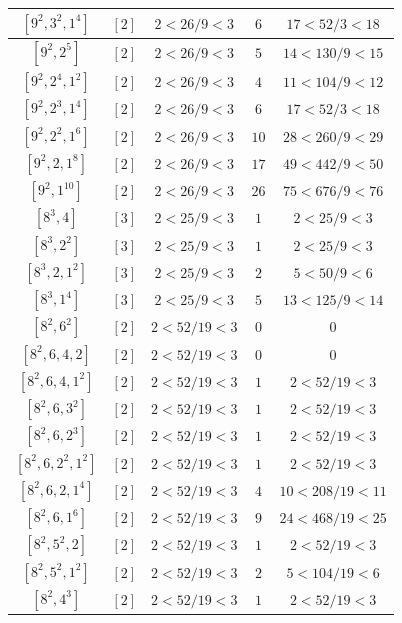 \documentclass{article}%
\begin{document}
\begin{center}
\begin{longtable}{||c|c|c|c|c||}
$[9^{2}, 3^{2}, 1^{4}]$ & $[2]$ & $2 < 26/9 < 3$ & $6$ & $17 < 52/3 < 18$ \\ \hline 
$[9^{2}, 2^{5}]$ & $[2]$ & $2 < 26/9 < 3$ & $5$ & $14 < 130/9 < 15$ \\ \hline 
$[9^{2}, 2^{4}, 1^{2}]$ & $[2]$ & $2 < 26/9 < 3$ & $4$ & $11 < 104/9 < 12$ \\ \hline 
$[9^{2}, 2^{3}, 1^{4}]$ & $[2]$ & $2 < 26/9 < 3$ & $6$ & $17 < 52/3 < 18$ \\ \hline 
$[9^{2}, 2^{2}, 1^{6}]$ & $[2]$ & $2 < 26/9 < 3$ & $10$ & $28 < 260/9 < 29$ \\ \hline 
$[9^{2}, 2, 1^{8}]$ & $[2]$ & $2 < 26/9 < 3$ & $17$ & $49 < 442/9 < 50$ \\ \hline 
$[9^{2}, 1^{10}]$ & $[2]$ & $2 < 26/9 < 3$ & $26$ & $75 < 676/9 < 76$ \\ \hline 
$[8^{3}, 4]$ & $[3]$ & $2 < 25/9 < 3$ & $1$ & $2 < 25/9 < 3$ \\ \hline 
$[8^{3}, 2^{2}]$ & $[3]$ & $2 < 25/9 < 3$ & $1$ & $2 < 25/9 < 3$ \\ \hline 
$[8^{3}, 2, 1^{2}]$ & $[3]$ & $2 < 25/9 < 3$ & $2$ & $5 < 50/9 < 6$ \\ \hline 
$[8^{3}, 1^{4}]$ & $[3]$ & $2 < 25/9 < 3$ & $5$ & $13 < 125/9 < 14$ \\ \hline 
$[8^{2}, 6^{2}]$ & $[2]$ & $2 < 52/19 < 3$ & $0$ & $0$ \\ \hline 
$[8^{2}, 6, 4, 2]$ & $[2]$ & $2 < 52/19 < 3$ & $0$ & $0$ \\ \hline 
$[8^{2}, 6, 4, 1^{2}]$ & $[2]$ & $2 < 52/19 < 3$ & $1$ & $2 < 52/19 < 3$ \\ \hline 
$[8^{2}, 6, 3^{2}]$ & $[2]$ & $2 < 52/19 < 3$ & $1$ & $2 < 52/19 < 3$ \\ \hline 
$[8^{2}, 6, 2^{3}]$ & $[2]$ & $2 < 52/19 < 3$ & $1$ & $2 < 52/19 < 3$ \\ \hline 
$[8^{2}, 6, 2^{2}, 1^{2}]$ & $[2]$ & $2 < 52/19 < 3$ & $1$ & $2 < 52/19 < 3$ \\ \hline 
$[8^{2}, 6, 2, 1^{4}]$ & $[2]$ & $2 < 52/19 < 3$ & $4$ & $10 < 208/19 < 11$ \\ \hline 
$[8^{2}, 6, 1^{6}]$ & $[2]$ & $2 < 52/19 < 3$ & $9$ & $24 < 468/19 < 25$ \\ \hline 
$[8^{2}, 5^{2}, 2]$ & $[2]$ & $2 < 52/19 < 3$ & $1$ & $2 < 52/19 < 3$ \\ \hline 
$[8^{2}, 5^{2}, 1^{2}]$ & $[2]$ & $2 < 52/19 < 3$ & $2$ & $5 < 104/19 < 6$ \\ \hline 
$[8^{2}, 4^{3}]$ & $[2]$ & $2 < 52/19 < 3$ & $1$ & $2 < 52/19 < 3$ \\ \hline 

\end{longtable}
\end{center}
\end{document}
